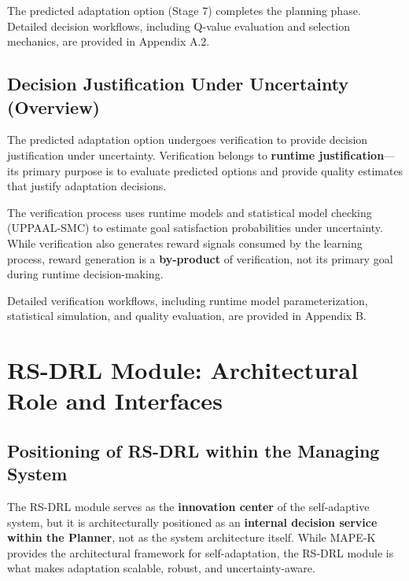 \documentclass[11pt,a4paper]{article}
\begin{document}
The predicted adaptation option (Stage 7) completes the planning phase. Detailed decision workflows, including Q-value evaluation and selection mechanics, are provided in Appendix A.2.

\subsection{Decision Justification Under Uncertainty (Overview)}
\label{subsec:justification-overview}

The predicted adaptation option undergoes verification to provide decision justification under uncertainty. Verification belongs to \textbf{runtime justification}---its primary purpose is to evaluate predicted options and provide quality estimates that justify adaptation decisions.

The verification process uses runtime models and statistical model checking (UPPAAL-SMC) to estimate goal satisfaction probabilities under uncertainty. While verification also generates reward signals consumed by the learning process, reward generation is a \textbf{by-product} of verification, not its primary goal during runtime decision-making.

Detailed verification workflows, including runtime model parameterization, statistical simulation, and quality evaluation, are provided in Appendix B.


\section{RS-DRL Module: Architectural Role and Interfaces}
\label{sec:rs-drl-architecture}

\subsection{Positioning of RS-DRL within the Managing System}
\label{subsec:rs-drl-positioning}

The RS-DRL module serves as the \textbf{innovation center} of the self-adaptive system, but it is architecturally positioned as an \textbf{internal decision service within the Planner}, not as the system architecture itself. While MAPE-K provides the architectural framework for self-adaptation, the RS-DRL module is what makes adaptation scalable, robust, and uncertainty-aware.
\end{document}
